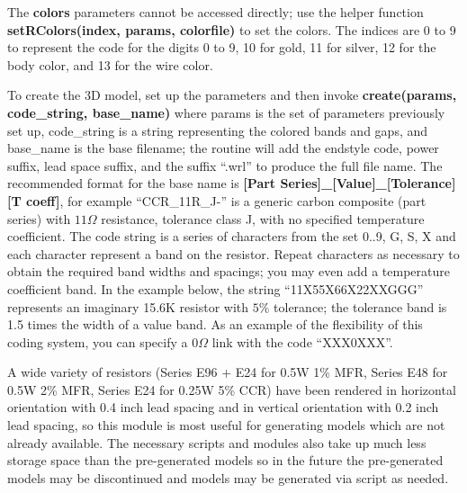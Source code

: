 \documentclass[a4paper, dvipdfm]{article}
\begin{document}
The \textbf{colors} parameters cannot be accessed directly; use the helper function
\textbf{setRColors(index, params, colorfile)} to set the colors. The indices are
0 to 9 to represent the code for the digits 0 to 9, 10 for gold, 11 for silver,
12 for the body color, and 13 for the wire color.

To create the 3D model, set up the parameters and then invoke
\textbf{create(params, code\_string, base\_name)} where params is the
set of parameters previously set up, code\_string is a string representing
the colored bands and gaps, and base\_name is the base filename; the
routine will add the endstyle code, power suffix, lead space suffix, and the
suffix ``.wrl'' to produce the full file name. The recommended format for the
base name is \textbf{[Part Series]\_[Value]\_[Tolerance][T coeff]}, for example
``CCR\_11R\_J-'' is a generic carbon composite (part series) with $11\Omega$
resistance, tolerance class J, with no specified temperature coefficient.
The code string is a series of characters from the set 0..9, G, S, X and
each character represent a band on the resistor. Repeat characters as
necessary to obtain the required band widths and spacings; you may even
add a temperature coefficient band. In the example below, the string
``11X55X66X22XXGGG'' represents an imaginary 15.6K resistor with $5\%$
tolerance; the tolerance band is 1.5 times the width of a value band.
As an example of the flexibility of this coding system, you can specify
a $0\Omega$ link with the code ``XXX0XXX''.

A wide variety of resistors (Series E96 + E24 for 0.5W 1\% MFR, Series E48
for 0.5W 2\% MFR, Series E24 for 0.25W 5\% CCR) have been rendered in
horizontal orientation with 0.4 inch lead spacing and in vertical
orientation with 0.2 inch lead spacing, so this module is most useful
for generating models which are not already available. The necessary
scripts and modules also take up much less storage space than the
pre-generated models so in the future the pre-generated models may
be discontinued and models may be generated via script as needed.
\end{document}

